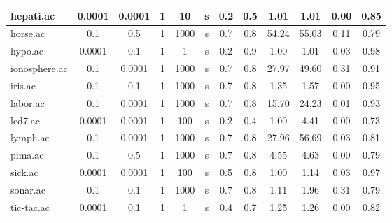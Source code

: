 \begin{table}[htbp]
\begin{tabular}{|l|c|c|c|c|c|c|c||c|c|c|c|}
		\hline
		hepati.ac      & 0.0001   & 0.0001      & 1              & 10                  & s        & 0.2    & 0.5   & 1.01           & 1.01           & 0.00           & 0.85           \\
		\hline
		horse.ac       & 0.1      & 0.5         & 1              & 1000                & s        & 0.7    & 0.8   & 54.24          & 55.03          & 0.11           & 0.79           \\
		\hline
		hypo.ac        & 0.0001   & 0.1         & 1              & 1                   & s        & 0.2    & 0.9   & 1.00           & 1.01           & 0.03           & 0.98           \\
		\hline
		ionosphere.ac  & 0.1      & 0.0001      & 1              & 1000                & s        & 0.7    & 0.8   & 27.97          & 49.60          & 0.31           & 0.91           \\
		\hline
		iris.ac        & 0.1      & 0.1         & 1              & 1000                & s        & 0.7    & 0.8   & 1.35           & 1.57           & 0.00           & 0.95           \\
		\hline
		labor.ac       & 0.1      & 0.0001      & 1              & 1000                & s        & 0.7    & 0.8   & 15.70          & 24.23          & 0.01           & 0.93           \\
		\hline
		led7.ac        & 0.0001   & 0.0001      & 1              & 100                 & s        & 0.2    & 0.4   & 1.00           & 4.41           & 0.00           & 0.73           \\
		\hline
		lymph.ac       & 0.1      & 0.0001      & 1              & 1000                & s        & 0.7    & 0.8   & 27.96          & 56.69          & 0.03           & 0.81           \\
		\hline
		pima.ac        & 0.1      & 0.5         & 1              & 1000                & s        & 0.7    & 0.8   & 4.55           & 4.63           & 0.00           & 0.79           \\
		\hline
		sick.ac        & 0.0001   & 0.0001      & 1              & 100                 & s        & 0.5    & 0.8   & 1.00           & 1.14           & 0.03           & 0.97           \\
		\hline
		sonar.ac       & 0.1      & 0.1         & 1              & 1000                & s        & 0.7    & 0.8   & 1.11           & 1.96           & 0.31           & 0.79           \\
		\hline
		tic-tac.ac     & 0.0001   & 0.1         & 1              & 1                   & s        & 0.4    & 0.7   & 1.25           & 1.26           & 0.00           & 0.82           \\

\end{tabular}
\end{table}
